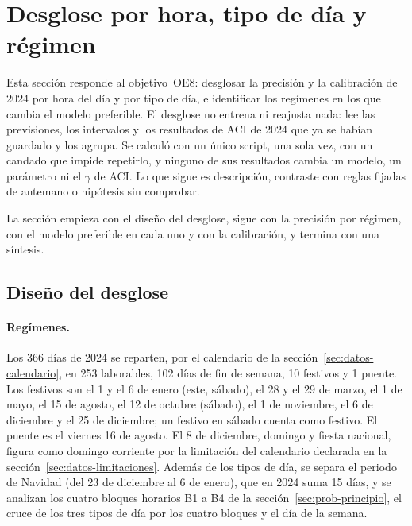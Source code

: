 \section{Desglose por hora, tipo de día y régimen}\label{sec:desglose}

Esta sección responde al objetivo~OE8: desglosar la precisión y la calibración
de 2024 por hora del día y por tipo de día, e identificar los regímenes en los
que cambia el modelo preferible. El desglose no entrena ni reajusta nada: lee
las previsiones, los intervalos y los resultados de ACI de 2024 que ya se
habían guardado y los agrupa. Se calculó con un único script, una sola vez, con
un candado que impide repetirlo, y ninguno de sus resultados cambia un modelo,
un parámetro ni el $\gamma$ de ACI. Lo que sigue es descripción, contraste con
reglas fijadas de antemano o hipótesis sin comprobar.

La sección empieza con el diseño del desglose, sigue con la precisión por
régimen, con el modelo preferible en cada uno y con la calibración, y termina
con una síntesis.

\subsection{Diseño del desglose}\label{sec:desg-diseno}

\paragraph{Regímenes.} Los 366 días de 2024 se reparten, por el calendario de
la sección~\ref{sec:datos-calendario}, en 253 laborables, 102 días de fin de
semana, 10 festivos y 1 puente. Los festivos son el 1 y el 6 de enero (este,
sábado), el 28 y el 29 de marzo, el 1 de mayo, el 15 de agosto, el 12 de octubre
(sábado), el 1 de noviembre, el 6 de diciembre y el 25 de diciembre; un festivo
en sábado cuenta como festivo. El puente es el viernes 16 de agosto. El 8 de
diciembre, domingo y fiesta nacional, figura como domingo corriente por la
limitación del calendario declarada en la
sección~\ref{sec:datos-limitaciones}. Además de los tipos de día, se separa el
periodo de Navidad (del 23 de diciembre al 6 de enero), que en 2024 suma 15 días,
y se analizan los cuatro bloques horarios B1 a B4 de la
sección~\ref{sec:prob-principio}, el cruce de los tres tipos de día por los
cuatro bloques y el día de la semana.

